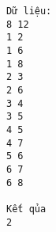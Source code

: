\begin{verbatim}
Dữ liệu:
8 12
1 2
1 6
1 8
2 3
2 6
3 4
3 5
4 5
4 7
5 6
6 7
6 8

Kết qủa
2
\end{verbatim}
